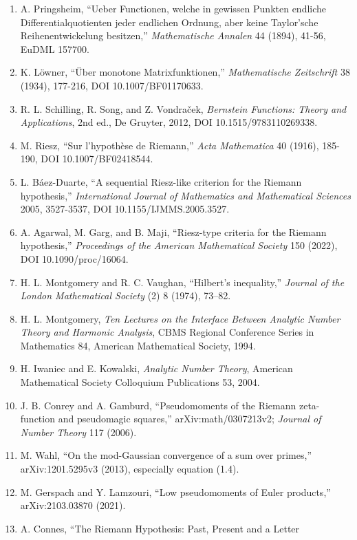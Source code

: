 \documentclass[
  11pt,
]{book}
\begin{document}
\begin{enumerate}
  \emph{Mathematische Zeitschrift} 9 (1921), 280-299, DOI
  10.1007/BF01279032.
\item
  A. Pringsheim, ``Ueber Functionen, welche in gewissen Punkten endliche
  Differentialquotienten jeder endlichen Ordnung, aber keine Taylor'sche
  Reihenentwickelung besitzen,'' \emph{Mathematische Annalen} 44 (1894),
  41-56, EuDML 157700.
\item
  K. Löwner, ``Über monotone Matrixfunktionen,'' \emph{Mathematische
  Zeitschrift} 38 (1934), 177-216, DOI 10.1007/BF01170633.
\item
  R. L. Schilling, R. Song, and Z. Vondraček, \emph{Bernstein Functions:
  Theory and Applications}, 2nd ed., De Gruyter, 2012, DOI
  10.1515/9783110269338.
\item
  M. Riesz, ``Sur l'hypothèse de Riemann,'' \emph{Acta Mathematica} 40
  (1916), 185-190, DOI 10.1007/BF02418544.
\item
  L. Báez-Duarte, ``A sequential Riesz-like criterion for the Riemann
  hypothesis,'' \emph{International Journal of Mathematics and
  Mathematical Sciences} 2005, 3527-3537, DOI 10.1155/IJMMS.2005.3527.
\item
  A. Agarwal, M. Garg, and B. Maji, ``Riesz-type criteria for the
  Riemann hypothesis,'' \emph{Proceedings of the American Mathematical
  Society} 150 (2022), DOI 10.1090/proc/16064.
\item
  H. L. Montgomery and R. C. Vaughan, ``Hilbert's inequality,''
  \emph{Journal of the London Mathematical Society} (2) 8 (1974),
  73--82.
\item
  H. L. Montgomery, \emph{Ten Lectures on the Interface Between Analytic
  Number Theory and Harmonic Analysis}, CBMS Regional Conference Series
  in Mathematics 84, American Mathematical Society, 1994.
\item
  H. Iwaniec and E. Kowalski, \emph{Analytic Number Theory}, American
  Mathematical Society Colloquium Publications 53, 2004.
\item
  J. B. Conrey and A. Gamburd, ``Pseudomoments of the Riemann
  zeta-function and pseudomagic squares,'' arXiv:math/0307213v2;
  \emph{Journal of Number Theory} 117 (2006).
\item
  M. Wahl, ``On the mod-Gaussian convergence of a sum over primes,''
  arXiv:1201.5295v3 (2013), especially equation (1.4).
\item
  M. Gerspach and Y. Lamzouri, ``Low pseudomoments of Euler products,''
  arXiv:2103.03870 (2021).
\item
  A. Connes, ``The Riemann Hypothesis: Past, Present and a Letter

\end{enumerate}
\end{document}
